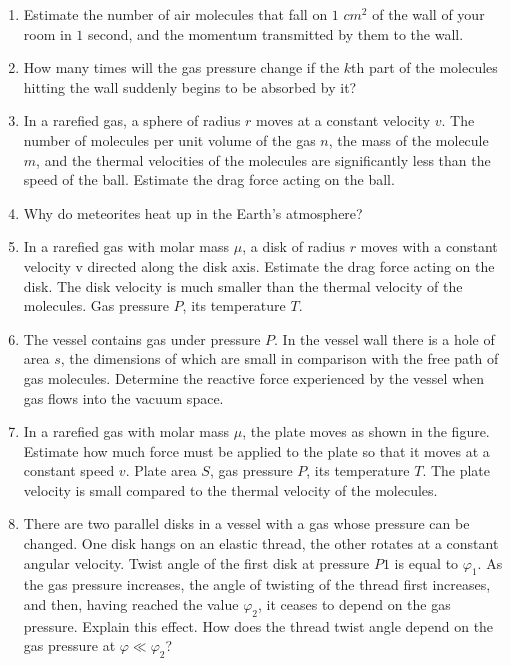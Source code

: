 \documentclass{article}
\begin{document}
\begin{enumerate}[label=5.4.\arabic*]


\item Estimate the number of air molecules that fall on $1$ $cm^2$ of the wall of your room in $1$ second, and the momentum transmitted by them to the wall.

\item How many times will the gas pressure change if the $k$th part of the molecules hitting the wall suddenly begins to be absorbed by it?

\item In a rarefied gas, a sphere of radius $r$ moves at a constant velocity $v$. The number of molecules per unit volume of the gas $n$, the mass of the molecule $m$, and the thermal velocities of the molecules are significantly less than the speed of the ball. Estimate the drag force acting on the ball.

\item Why do meteorites heat up in the Earth's atmosphere?

\item In a rarefied gas with molar mass $\mu$, a disk of radius $r$ moves with a constant velocity v directed along the disk axis. Estimate the drag force acting on the disk. The disk velocity is much smaller than the thermal velocity of the molecules. Gas pressure $P$, its temperature $T$.

\item The vessel contains gas under pressure $P$. In the vessel wall there is a hole of area $s$, the dimensions of which are small in comparison with the free path of gas molecules. Determine the reactive force experienced by the vessel when gas flows into the vacuum space.

\item In a rarefied gas with molar mass $\mu$, the plate moves as shown in the figure. Estimate how much force must be applied to the plate so that it moves at a constant speed $v$. Plate area $S$, gas pressure $P$, its temperature $T$. The plate velocity is small compared to the thermal velocity of the molecules.

\item There are two parallel disks in a vessel with a gas whose pressure can be changed. One disk hangs on an elastic thread, the other rotates at a constant angular velocity. Twist angle of the first disk at pressure $P1$ is equal to $\varphi_1$. As the gas pressure increases, the angle of twisting of the thread first increases, and then, having reached the value $\varphi_2$, it ceases to depend on the gas pressure. Explain this effect. How does the thread twist angle depend on the gas pressure at $\varphi \ll \varphi_2$?


\end{enumerate}
\end{document}
